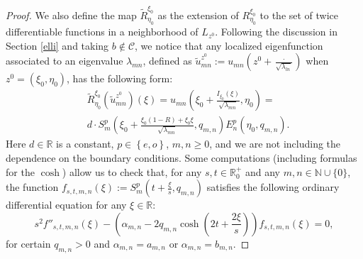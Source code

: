 \documentclass{amsart}
\theoremstyle{definition}
\theoremstyle{remark}
\newcommand{\al}{\alpha}
\renewcommand\geq\geqslant
\numberwithin{equation}{section}
\theoremstyle{definition}
\theoremstyle{remark}
\begin{document}
\begin{proof}
 We also define the map  $\tilde{R}_{\eta_0}^{\xi_0}$ as the extension of $R_{\eta_0}^{\xi_0}$ to the set of twice differentiable functions in a neighborhood of $L_{z^0}$.  Following the discussion in Section \ref{elli} and taking $b\notin\mathcal{C}$, we notice that any localized eigenfunction associated to an eigenvalue $\lambda_{mn}$, defined as $\tilde{u}_{mn}^{z^0}:=u_{mn}\left(z^0+\frac{\cdot}{\sqrt{\lambda_{ln}}}\right)$ when $z^0=\left(\xi_0,\eta_0\right)$, has the following form: \begin{equation}
		\begin{aligned}
			& \tilde{R}_{\eta_0}^{\xi_0}\left(\tilde{u}_{mn}^{z^0}\right)(\xi)=u_{mn}\left(\xi_0+\frac{I_{\xi_0}(\xi) }{\sqrt{\lambda_{mn}}},\eta_0\right)=\\&d\cdot S^p_m\left(\xi_0+\frac{\xi_0(1-R)+\xi_b\xi}{\sqrt{\lambda_{mn}}},q_{m,n}\right)E^p_n\left(\eta_0,q_{m,n}\right).
		\end{aligned}
	\end{equation}
    Here  $d\in\mathbb{R}$ is a constant, $p\in\left\{e,o\right\}$, $m,n\geq 0$, and we are not including the dependence on the boundary conditions. Some computations (including formulas for the $\cosh$) allow us to check that, for any $s,t\in\mathbb{R}^+_0$ and any $m,n\in\mathbb{N}\cup\{0\}$, the function $f_{s,t,m,n}(\xi):=S_m^p\left(t+\frac{\xi}{s},q_{m,n}\right)$ satisfies the following ordinary differential equation for any $\xi\in\mathbb{R}$:
	\begin{equation}
		s^2f''_{s,t,m,n}(\xi)-\left(\al_{m,n}-2q_{m,n}\cosh\left(2t+\frac{2\xi}{s}\right)\right)f_{s,t,m,n}(\xi)=0,
	\end{equation}for certain $q_{m,n}>0$ and $\al_{m,n}=a_{m,n}$ or $\alpha_{m,n}=b_{m,n}$.
    

\end{proof}
\end{document}
